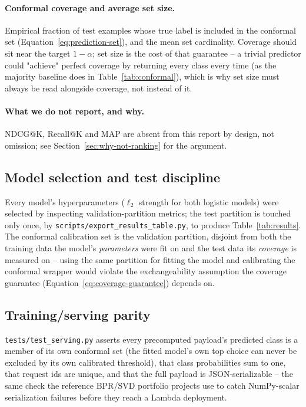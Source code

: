 \paragraph{Conformal coverage and average set size.} Empirical fraction of
test examples whose true label is included in the conformal set
(Equation~\ref{eq:prediction-set}), and the mean set cardinality. Coverage
should sit near the target $1-\alpha$; set size is the cost of that
guarantee -- a trivial predictor could "achieve" perfect coverage by
returning every class every time (as the majority baseline does in
Table~\ref{tab:conformal}), which is why set size must always be read
alongside coverage, not instead of it.

\paragraph{What we do not report, and why.} NDCG@K, Recall@K and MAP are
absent from this report by design, not omission; see
Section~\ref{sec:why-not-ranking} for the argument.

\subsection{Model selection and test discipline}

Every model's hyperparameters ($\ell_2$ strength for both logistic models)
were selected by inspecting validation-partition metrics; the test partition
is touched only once, by \texttt{scripts/export\_results\_table.py}, to
produce Table~\ref{tab:results}. The conformal calibration set is the
validation partition, disjoint from both the training data the model's
\emph{parameters} were fit on and the test data its \emph{coverage} is
measured on -- using the same partition for fitting the model and
calibrating the conformal wrapper would violate the exchangeability
assumption the coverage guarantee (Equation~\ref{eq:coverage-guarantee})
depends on.

\subsection{Training/serving parity}

\texttt{tests/test\_serving.py} asserts every precomputed payload's predicted
class is a member of its own conformal set (the fitted model's own top
choice can never be excluded by its own calibrated threshold), that
class probabilities sum to one, that request ids are unique, and that the
full payload is JSON-serializable -- the same check the reference
BPR/SVD portfolio projects use to catch NumPy-scalar serialization failures
before they reach a Lambda deployment.
